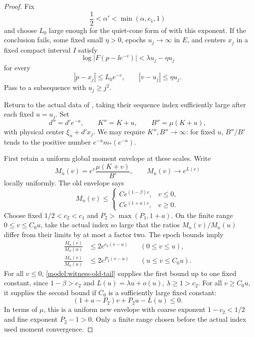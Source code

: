 \begin{proof}
Fix
\[
 \frac12<\alpha'<\min(\alpha,c_1,1)
\]
and choose \(L_0\) large enough for the quiet-cone form
of  with this exponent.
If the conclusion fails, some fixed small \(\eta>0\),
epochs \(u_j\to\infty\) in \(E\), and centers \(x_j\)
in a fixed compact interval \(I\) satisfy
\begin{equation}
\label{model:failed-witness}
 \log|F(p-\ii e^{-v})|<\lambda u_j-\eta u_j
\end{equation}
for every
\[
 |p-x_j|\le L_0e^{-v},\qquad |v-u_j|\le\eta u_j.
\]
Pass to a subsequence with \(u_j\ge j^2\).

Return to the actual data of
, taking their sequence index
sufficiently large after each fixed \(u=u_j\).  Set
\begin{equation}
\label{model:witness-rescaling}
 d''=d'e^{-u},\qquad K''=K+u,\qquad B''=\mu(K+u),
\end{equation}
with physical center \(\xi_n+d'x_j\).
We may require \(K'',B''\to\infty\): for fixed \(u\),
\(B''/B'\) tends to the positive number
\(e^{-u}m_*(e^{-u})\).

First retain a uniform global moment envelope at these
scales.  Write
\[
 M_n(v)=e^v\frac{\mu(K+v)}{B'},\qquad
 M_n(v)\longrightarrow e^{L(v)}
\]
locally uniformly.  The old envelope says
\begin{equation}
\label{model:witness-old-tail}
 M_n(v)\le
 \begin{cases}
  C e^{(1-\beta)v},&v\le0,\\
  C e^{(1+a)v},&v\ge0.
 \end{cases}
\end{equation}
Choose fixed \(1/2<c_2<c_1\) and
\(P_2>\max(P_1,1+a)\).
On the finite range \(0\le v\le C_0u\), take the
actual index so large that the ratios
\(M_n(v)/M_n(u)\) differ from their limits by at most
a factor two.  The epoch bounds imply
\begin{align}
\label{model:witness-local-envelope}
 \frac{M_n(v)}{M_n(u)}
 &\le2e^{c_2(v-u)}&& (0\le v\le u),\\
\label{model:witness-local-fine}
 \frac{M_n(v)}{M_n(u)}
 &\le2e^{P_2(v-u)}&& (u\le v\le C_0u).
\end{align}
For all \(v\le0\), \eqref{model:witness-old-tail}
supplies the first bound up to one fixed constant,
since \(1-\beta>c_2\) and
\(L(u)=\lambda u+o(u)\), \(\lambda\ge1>c_2\).
For all \(v\ge C_0u\), it supplies the second bound
if \(C_0\) is a sufficiently large fixed constant:
\[
 (1+a-P_2)v+P_2u-L(u)\le0.
\]
In terms of \(\mu\), this is a uniform new envelope
with coarse exponent \(1-c_2<1/2\) and fine exponent
\(P_2-1>0\).  Only a finite range chosen before the
actual index used moment convergence.


\end{proof}

